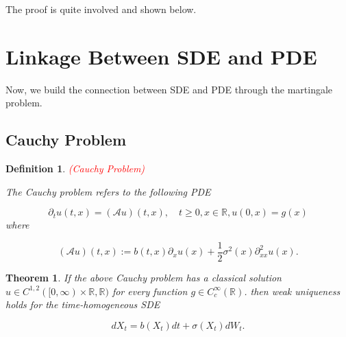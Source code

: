 \documentclass{article}
\newtheorem{definition}{Definition}
\newtheorem{theorem}{Theorem}
\begin{document}
The proof is quite involved and shown below. 

\section{Linkage Between SDE and PDE}
Now, we build the connection between SDE and PDE through the martingale problem.

\subsection{Cauchy Problem}

\begin{definition} \textcolor{red}{(Cauchy Problem)}

The Cauchy problem refers to the following PDE

\begin{equation*}
\partial_tu(t,x)=(\mathcal{A}u)(t,x), \quad t\geq0, x\in\mathbb{R},u(0,x)=g(x)
\end{equation*}
where

\begin{equation*} 
(\mathcal{A}u)(t,x):=b(t,x)\partial_xu(x)+\frac{1}{2}\sigma^2(x)\partial^2_{xx}u(x).
\end{equation*}

\end{definition}

\begin{theorem}
If the above Cauchy problem has a classical solution $u\in C^{1,2}([0,\infty)\times\mathbb{R},\mathbb{R})$ for every function $g\in C_c^\infty(\mathbb{R})$. then weak uniqueness holds for the time-homogeneous SDE

\begin{equation} \label{time_homo_sde}
dX_t=b(X_t)dt + \sigma(X_t)dW_t.
\end{equation}

\end{theorem}
\end{document}
